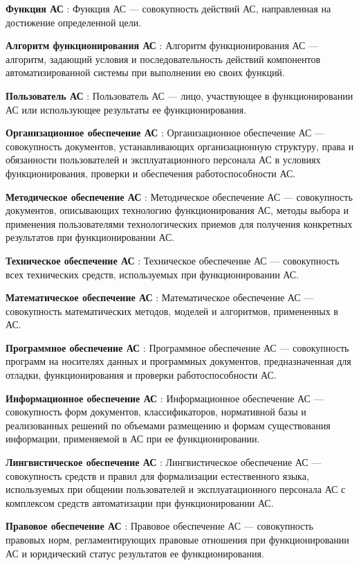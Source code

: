 \textbf{Функция АС} : Функция АС — совокупность действий АС, направленная на достижение определенной цели.

\textbf{Алгоритм функционирования АС} : Алгоритм функционирования АС — алгоритм, задающий условия и последовательность действий компонентов автоматизированной системы при выполнении ею своих функций.

\textbf{ Пользователь АС} : Пользователь АС — лицо, участвующее в функционировании АС или использующее результаты ее функционирования.

\textbf{ Организационное обеспечение АС} : Организационное обеспечение АС — совокупность документов, устанавливающих организационную структуру, права и обязанности пользователей и эксплуатационного персонала АС в условиях функционирования, проверки и обеспечения работоспособности АС.

\textbf{ Методическое обеспечение АС} : Методическое обеспечение АС — совокупность документов, описывающих технологию функционирования АС, методы выбора и применения пользователями технологических приемов для получения конкретных результатов при функционировании АС.

\textbf{ Техническое обеспечение АС} : Техническое обеспечение АС — совокупность всех технических средств, используемых при функционировании АС.

\textbf{ Математическое обеспечение АС} : Математическое обеспечение АС — совокупность математических методов, моделей и алгоритмов, примененных в АС.

\textbf{ Программное обеспечение АС} : Программное обеспечение АС — совокупность программ на носителях данных и программных документов, предназначенная для отладки, функционирования и проверки работоспособности АС.

\textbf{ Информационное обеспечение АС} : Информационное обеспечение АС — совокупность форм документов, классификаторов, нормативной базы и реализованных решений по объемами размещению и формам существования информации, применяемой в АС при ее функционировании.

\textbf{ Лингвистическое обеспечение АС} : Лингвистическое обеспечение АС — совокупность средств и правил для формализации естественного языка, используемых при общении пользователей и эксплуатационного персонала АС с комплексом средств автоматизации при функционировании АС.

\textbf{ Правовое обеспечение АС } : Правовое обеспечение АС — совокупность правовых норм, регламентирующих правовые отношения при функционировании АС и юридический статус результатов ее функционирования.

